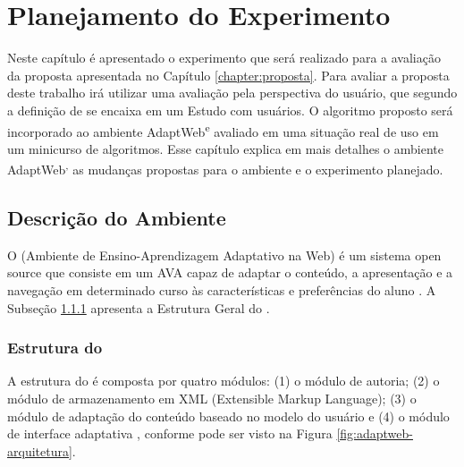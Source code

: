 \chapter{Planejamento do Experimento}\label{chapter:experimento}

Neste capítulo é apresentado o experimento que será realizado para a avaliação da proposta apresentada no Capítulo \ref{chapter:proposta}.
Para avaliar a proposta deste trabalho irá utilizar uma avaliação pela perspectiva do usuário, que segundo a definição de
 se encaixa em um Estudo com usuários. O algoritmo proposto será incorporado ao ambiente
AdaptWeb\textsuperscript e avaliado em uma situação real de uso em um minicurso de algoritmos. Esse capítulo explica
em mais detalhes o ambiente AdaptWeb\textsuperscript, as mudanças propostas para o ambiente e o experimento planejado.

\section{Descrição do Ambiente \adaptweb}

O \adaptweb (Ambiente de Ensino-Aprendizagem Adaptativo na Web) é um sistema open source
que consiste em um AVA capaz de adaptar o conteúdo, a apresentação e a navegação em determinado curso às características
e preferências do aluno \cite{gasparini2009adaptweb}. A Subseção \ref{subsection:estrutura-adaptweb} apresenta a Estrutura Geral do
\adaptweb.

\subsection{Estrutura do \adaptweb}\label{subsection:estrutura-adaptweb}

A estrutura do \adaptweb é composta por quatro módulos: (1) o módulo de autoria; (2) o
módulo de armazenamento em XML (Extensible Markup Language); (3) o módulo de adaptação do conteúdo baseado no modelo do
usuário e (4) o módulo de interface adaptativa \cite{gasparini2003interface}, conforme pode ser visto na Figura
\ref{fig:adaptweb-arquitetura}.

